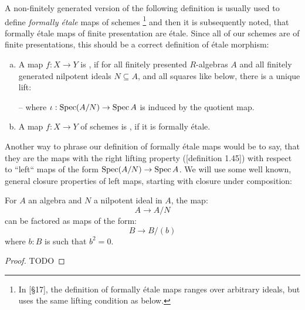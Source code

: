 A non-finitely generated version of the following definition is usually used
to define \emph{formally étale} maps of schemes
\footnote{In \cite{EGAIV3}[§17], the definition of formally étale maps ranges over arbitrary ideals, but uses the same lifting condition as below.}
and then it is subsequently noted,
that formally étale maps of finite presentation are étale.
Since all of our schemes are of finite presentations, this should be a correct definition of étale morphism:

\begin{definition}
  \begin{enumerate}[(a)]
  \item   A map $f:X\to Y$ is ,
    if for all finitely presented $R$-algebras $A$ and all finitely generated nilpotent ideals $N\subseteq A$,
    and all squares like below, there is a unique lift:
    \begin{center}
    \end{center}
    -- where $\iota:\operatorname{Spec} (A/N)\to \operatorname{Spec} A$ is induced by the quotient map.
  \item A map $f:X\to Y$ of schemes is , if it is formally étale.
  \end{enumerate}
\end{definition}

Another way to phrase our definition of formally étale maps would be to say,
that they are the maps with the right lifting property (\cite{modalities}[definition 1.45]) with respect to ``left`` maps of the form $\operatorname{Spec} (A/N)\to \operatorname{Spec} A$.
We will use some well known, general closure properties of left maps, starting with closure under composition:

\begin{lemma}%
\label{decomposition-nilpotent}
For $A$ an algebra and $N$ a nilpotent ideal in $A$, the map:
\[A
\to A/N
\] 
can be factored as maps of the form:
\[
B\to B/(b)
\]
where $b:B$ is such that $b^2=0$.
\end{lemma}

\begin{proof}
TODO
\end{proof}

